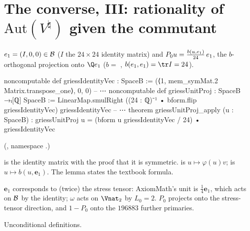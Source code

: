 \section{The converse, III: rationality of \texorpdfstring{$\mathrm{Aut}(V^\natural)$}{Aut(V-natural)} given the commutant}\label{ch22:sec:rationalgriess}

\begin{definition}\label{ch22:def:P0}
$\mathbf \mathbf{e}_1=(I,0,0)\in\mathcal{B}$ ($I$ the $24\times24$ identity matrix) and $P_0u=\frac{b(u,\mathbf \mathbf{e}_1)}{24}\,\mathbf \mathbf{e}_1$, the
$b$-orthogonal projection onto $\Q\mathbf \mathbf{e}_1$ ($b=$ , $b(\mathbf \mathbf{e}_1,\mathbf \mathbf{e}_1)=\tr I=24$).
\end{definition}
\begin{leancode}
noncomputable def griessIdentityVec : SpaceB :=
  (⟨1, mem_symMat.2 Matrix.transpose_one⟩, 0, 0)
-- ⋯
noncomputable def griessUnitProj : SpaceB →ₗ[ℚ] SpaceB :=
  LinearMap.smulRight ((24 : ℚ)⁻¹ • bform.flip griessIdentityVec) griessIdentityVec
-- ⋯
theorem griessUnitProj_apply (u : SpaceB) :
    griessUnitProj u = (bform u griessIdentityVec / 24) • griessIdentityVec
\end{leancode}
(, namespace .)
\begin{dictionary}
 is the identity matrix with the proof that it is symmetric.
 is $u\mapsto\varphi(u)v$;  is $u\mapsto b(u,\mathbf{e}_1)$.  The
 lemma states the textbook formula.
\end{dictionary}
\begin{physics}
$\mathbf{e}_1$ corresponds to (twice) the stress tensor: AxiomMath's unit is $\frac14 \mathbf{e}_1$, which acts on $\mathcal{B}$ by the
identity; $\omega$ acts on $\Vnat_2$ by $L_0=2$.  $P_0$ projects onto the stress-tensor direction, and $1-P_0$ onto the
$196883$ further primaries.
\end{physics}
\begin{status}Unconditional definitions.\end{status}

